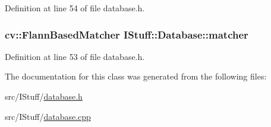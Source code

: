 Definition at line 54 of file database.\-h.

\hypertarget{class_i_stuff_1_1_database_a871b6feeaa1b3d1e75d3b4b8edb86a84}{
\subsubsection[{matcher}]{\setlength{\rightskip}{0pt plus 5cm}cv\-::\-Flann\-Based\-Matcher I\-Stuff\-::\-Database\-::matcher\hspace{0.3cm}{\ttfamily [private]}}}\label{class_i_stuff_1_1_database_a871b6feeaa1b3d1e75d3b4b8edb86a84}


Definition at line 53 of file database.\-h.



The documentation for this class was generated from the following files\-:\begin{DoxyCompactItemize}
\item 
src/\-I\-Stuff/\hyperlink{database_8h}{database.\-h}\item 
src/\-I\-Stuff/\hyperlink{database_8cpp}{database.\-cpp}\end{DoxyCompactItemize}
